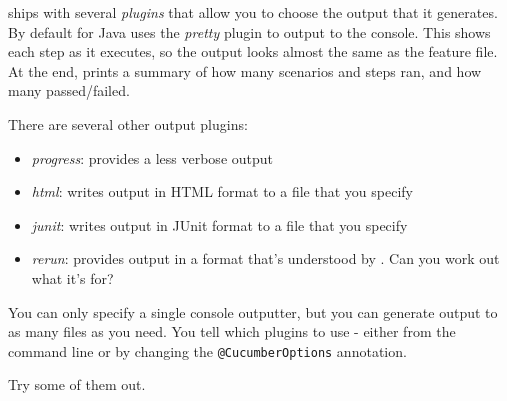 \CUKE{} ships with several \emph{plugins} that allow you to choose the output that it generates. By default \CUKE{} for Java uses the \emph{pretty} plugin to output to the console. This shows each step as it executes, so the output looks almost the same as the feature file. At the end, \CUKE{} prints a summary of how many scenarios and steps ran, and how many passed/failed.

There are several other output plugins: 

\begin{itemize}
    \item \emph{progress}: provides a less verbose output
    \item \emph{html}: writes output in HTML format to a file that you specify
    \item \emph{junit}: writes output in JUnit format to a file that you specify
    \item \emph{rerun}: provides output in a format that's understood by \CUKE{}. Can you work out what it's for?
\end{itemize}

You can only specify a single console outputter, but you can generate output to as many files as you need. You tell \CUKE{} which plugins to use - either from the command line or by changing the \texttt{@CucumberOptions} annotation.

Try some of them out.